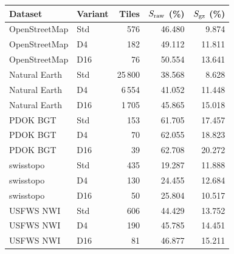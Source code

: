 \begingroup\small\setlength{\tabcolsep}{3pt}
\begin{longtable}{llrrr}
\toprule
Dataset & Variant & Tiles & $S_{\rm raw}$ (\%) & $S_{\rm gz}$ (\%) \\
\midrule
OpenStreetMap & Std & 576 & 46.480 & 9.874 \\
OpenStreetMap & D4 & 182 & 49.112 & 11.811 \\
OpenStreetMap & D16 & 76 & 50.554 & 13.641 \\
Natural Earth & Std & 25\,800 & 38.568 & 8.628 \\
Natural Earth & D4 & 6\,554 & 41.052 & 11.448 \\
Natural Earth & D16 & 1\,705 & 45.865 & 15.018 \\
PDOK BGT & Std & 153 & 61.705 & 17.457 \\
PDOK BGT & D4 & 70 & 62.055 & 18.823 \\
PDOK BGT & D16 & 39 & 62.708 & 20.272 \\
swisstopo & Std & 435 & 19.287 & 11.888 \\
swisstopo & D4 & 130 & 24.455 & 12.684 \\
swisstopo & D16 & 50 & 25.804 & 10.517 \\
USFWS NWI & Std & 606 & 44.429 & 13.752 \\
USFWS NWI & D4 & 190 & 45.785 & 14.451 \\
USFWS NWI & D16 & 81 & 46.877 & 15.211 \\
\bottomrule
\end{longtable}
\endgroup
